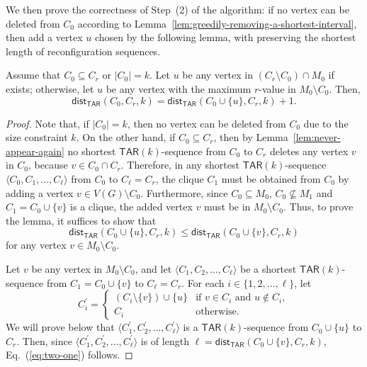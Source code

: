 \documentclass{llncs}
\newcommand{\TAR}[1]{\mathsf{TAR}(#1)}
\newcommand{\ini}{0}
\newcommand{\tar}{r}
\newcommand{\cliq}{C}
\newcommand{\distTAR}[3]{\mathsf{dist_{TAR}}(#1,#2,#3)}
\newcounter{one}
\newcounter{two}
\begin{document}
	We then prove the correctness of Step~(2) of the algorithm:
if no vertex can be deleted from $\cliq_{\ini}$ according to Lemma~\ref{lem:greedily-removing-a-shortest-interval}, then add a vertex $u$ chosen by the following lemma, with preserving the shortest length of reconfiguration sequences.
	\begin{lemma} \label{lem:greedily-taking-a-longest-interval}
	Assume that $\cliq_{\ini} \subseteq \cliq_{\tar}$ or $|\cliq_{\ini}| = k$.
	Let $u$ be any vertex in $(\cliq_{\tar} \setminus \cliq_{\ini}) \cap M_{0}$ if exists{\rm ;} 
otherwise, let $u$ be any vertex with the maximum $r$-value in $M_{0} \setminus \cliq_{\ini}$.
	Then,
	\[
		\distTAR{\cliq_{\ini}}{\cliq_{\tar}}{k} = \distTAR{\cliq_{\ini} \cup \{u\}}{\cliq_{\tar}}{k} + 1.
	\]
	\end{lemma}
	\begin{proof}
	Note that, if $|\cliq_{\ini}| = k$, then no vertex can be deleted from $\cliq_{\ini}$ due to the size constraint $k$.
	On the other hand, if $\cliq_{\ini} \subseteq \cliq_{\tar}$, then by Lemma~\ref{lem:never-appear-again} no shortest $\TAR{k}$-sequence from $\cliq_{\ini}$ to $\cliq_{\tar}$ deletes any vertex $v$ in $\cliq_{\ini}$, because $v \in \cliq_{\ini} \cap \cliq_{\tar}$.
	Therefore, in any shortest $\TAR{k}$-sequence $\langle \cliq_{\ini}, \cliq_{1}, \ldots, \cliq_{\ell} \rangle$ from $\cliq_{\ini}$ to $\cliq_{\ell} = \cliq_{\tar}$, the clique $\cliq_1$ must be obtained from $\cliq_{\ini}$ by adding a vertex $v \in V(G) \setminus \cliq_{\ini}$.
	Furthermore, since $\cliq_{\ini} \subseteq M_0$, $\cliq_{\ini} \not\subseteq M_1$ and $\cliq_1 = \cliq_{\ini} \cup \{v\}$ is a clique, the added vertex $v$ must be in $M_0 \setminus \cliq_{\ini}$. 
	Thus, to prove the lemma, it suffices to show that
	\begin{equation} \label{eq:two-one}
		\distTAR{\cliq_{\ini} \cup \{u\}}{\cliq_{\tar}}{k} \le \distTAR{\cliq_{\ini} \cup \{v\}}{\cliq_{\tar}}{k}
	\end{equation}
for any vertex $v \in M_{0} \setminus \cliq_{\ini}$. 

	Let  $v$ be any vertex in $M_{0} \setminus \cliq_{\ini}$, and let $\langle \cliq_{1}, \cliq_2, \ldots, \cliq_{\ell} \rangle$ be a shortest $\TAR{k}$-sequence from $\cliq_{1} = \cliq_{\ini} \cup \{v\}$ to $\cliq_{\ell} = \cliq_{\tar}$.
	For each $i \in \{1,2,\ldots, \ell\}$, let 
	\begin{equation} \label{eq:two-two}
		\cliq_{i}^\prime =
				\begin{cases}
					(\cliq_{i} \setminus \{v\}) \cup \{u\} & \text{if } v \in \cliq_{i} \text{ and } u \notin \cliq_{i},\\
					\cliq_{i} & \text{otherwise}.
				\end{cases}
	\end{equation}
	We will prove below that $\langle \cliq_{1}^\prime, \cliq_2^\prime, \ldots, \cliq_{\ell}^\prime \rangle$ is a $\TAR{k}$-sequence from $\cliq_{\ini} \cup \{u\}$ to $\cliq_{\tar}$.
	Then, since $\langle \cliq_{1}^\prime, \cliq_2^\prime, \ldots, \cliq_{\ell}^\prime \rangle$ is of length $\ell = \distTAR{\cliq_{\ini} \cup \{v\}}{\cliq_{\tar}}{k}$, Eq.~(\ref{eq:two-one}) follows. 
	

\end{proof}
\end{document}
